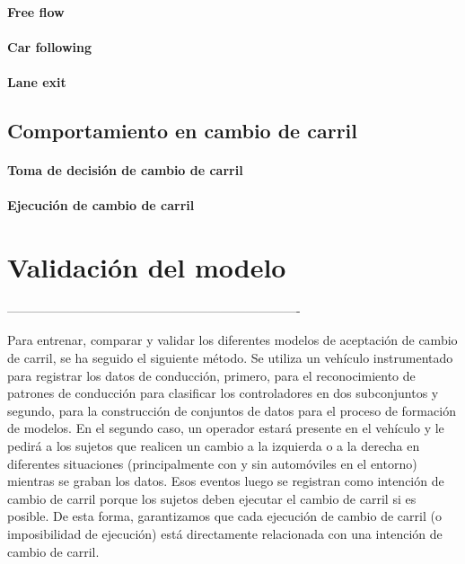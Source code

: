 {\paragraph{Free flow}

\paragraph{Car following}

\paragraph{Lane exit}

\subsection{Comportamiento en cambio de carril}

\paragraph{Toma de decisión de cambio de carril}

\paragraph{Ejecución de cambio de carril}

\section{Validación del modelo}






----------------------------------------------------------------------


Para entrenar, comparar y validar los diferentes modelos de aceptación de cambio de carril, se ha seguido el siguiente método. Se utiliza un vehículo instrumentado para registrar los datos de conducción, primero, para el reconocimiento de patrones de conducción para clasificar los controladores en dos subconjuntos y segundo, para la construcción de conjuntos de datos para el proceso de formación de modelos. En el segundo caso, un operador estará presente en el vehículo y le pedirá a los sujetos que realicen un cambio a la izquierda o a la derecha en diferentes situaciones (principalmente con y sin automóviles en el entorno) mientras se graban los datos. Esos eventos luego se registran como intención de cambio de carril porque los sujetos deben ejecutar el cambio de carril si es posible. De esta forma, garantizamos que cada ejecución de cambio de carril (o imposibilidad de ejecución) está directamente relacionada con una intención de cambio de carril.

}
